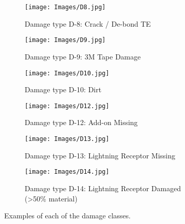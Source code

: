    \begin{figure*}[htbp]
   \ContinuedFloat
        \centering
        \begin{subfigure}[b]{0.48\textwidth}
            \centering
            \texttt{[image: Images/D8.jpg]}
            \caption[Damage type D-8: Crack / De-bond TE]%
            {{\small Damage type D-8: Crack / De-bond TE}}    
            \label{fig:D8}
        \end{subfigure}
        \hfill
        \begin{subfigure}[b]{0.48\textwidth}
            \centering
            \texttt{[image: Images/D9.jpg]}
            \caption[Damage type D-9: 3M Tape Damage]%
            {{\small Damage type D-9: 3M Tape Damage}}    
            \label{fig:D9}
        \end{subfigure}
        \hfill
        \begin{subfigure}[b]{0.48\textwidth}
            \centering
            \texttt{[image: Images/D10.jpg]}
            \caption[Damage type D-10: Dirt]%
            {{\small Damage type D-10: Dirt}}    
            \label{fig:D10}
        \end{subfigure}
        \hfill
        \begin{subfigure}[b]{0.48\textwidth}
            \centering
            \texttt{[image: Images/D12.jpg]}
            \caption[Damage type D-12: Add-on Missing]%
            {{\small Damage type D-12: Add-on Missing}}    
            \label{fig:D12}
        \end{subfigure}
        \hfill
        \begin{subfigure}[b]{0.48\textwidth}
            \centering
            \texttt{[image: Images/D13.jpg]}
            \caption[Damage type D-13: Lightning Receptor Missing]%
            {{\small Damage type D-13: Lightning Receptor Missing}}    
            \label{fig:D13}
        \end{subfigure}
        \hfill
        \begin{subfigure}[b]{0.48\textwidth}
            \centering
            \texttt{[image: Images/D14.jpg]}
            \caption[Damage type D-14: Lightning Receptor Damaged (>50\% material)]%
            {{\small Damage type D-14: Lightning Receptor Damaged (>50\% material)}}    
            \label{fig:D14}
        \end{subfigure}
        \hfill
        \caption[Examples of each of the damage classes.]
        {\small Examples of each of the damage classes.}    
        \label{fig:dam_ex}
    \end{figure*}

